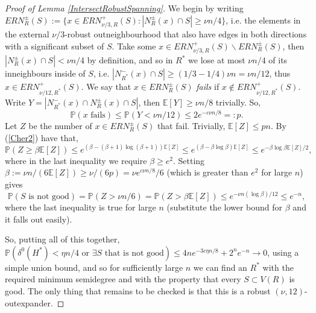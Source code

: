 \documentclass[10pt,letterpaper, reqno]{amsart}
\theoremstyle{definition}
\numberwithin{equation}{section}
\begin{document}
\begin{proof}[Proof of Lemma \ref{IntersectRobustSpanning}]
	We begin by writing $ERN^\pm_R(S) := \{ x \in ERN^+_{\nu/3,R}(S) : |N_R^\pm(x) \cap S| \geq \nu n /4 \}$, i.e. the elements in the external $\nu/3$-robust outneighbourhood that also have edges in both directions with a significant subset of $S$. Take some $x \in ERN^+_{\nu/3,R}(S) \backslash ERN^\pm_R(S)$, then $|N^\pm_R(x) \cap S | < \nu n/4$ by definition, and so in $R^*$ we lose at most $\nu n/4$ of its inneighbours inside of $S$, i.e. $|N_{R^*}^-(x) \cap S | \geq (1/3-1/4)\nu n = \nu n/12$, thus $x \in ERN^+_{\nu/12,R^*}(S)$. We say that $x \in ERN^\pm_R(S)$ \textit{fails} if $x \not \in ERN^+_{\nu/12,R^*}(S)$. Write $Y = |N^-_{R^*}(x) \cap N^\pm_R(x) \cap S|$, then $\mathbb{E}[Y] \geq \nu n/8$ trivially. So, 
	$$\mathbb{P}(x \text{ fails}) \leq \mathbb{P}(Y < \nu n/12) \leq 2e^{-c\nu n/8} =: p.$$
	Let $Z$ be the number of $x \in ERN^\pm_R(S)$ that fail. Trivially, $\mathbb{E}[Z] \leq pn$. By (\ref{Cher2}) have that,
	$$\mathbb{P}(Z \geq \beta\mathbb{E}[Z]) \leq e^{(\beta- (\beta+1)\log(\beta+1))\mathbb{E}[Z]} \leq
	e^{(\beta- \beta\log\beta)\mathbb{E}[Z]} \leq 
	 e^{-\beta\log \beta \mathbb{E}[Z]/2},$$
	 where in the last inequality we require $\beta \geq e^2$.
	Setting $\beta:= \nu n /(6\mathbb{E}[Z]) \geq \nu /(6p) = \nu e^{c\nu n /8}/6$ (which is greater than $e^2$ for large $n$) gives
	$$\mathbb{P}(S \text{ is not good}) = \mathbb{P}(Z> \nu n /6) = \mathbb{P}(Z > \beta\mathbb{E}[Z]) \leq e^{-\nu n (\log \beta )/12} \leq e^{-n},$$
	where the last inequality is true for large $n$ (substitute the lower bound for $\beta$ and it falls out easily).
	
	So, putting all of this together, $\mathbb{P}(\delta ^0(H^*) < \eta n/4 \text{ or } \exists S \text{ that is not good}) \leq 4ne^{-3c\eta n /8 } + 2^ne^{-n} \to 0$, using a simple union bound, and so for sufficiently large $n$ we can find an $R^*$ with the required minimum semidegree and with the property that every $S\subset V(R)$ is good. The only thing that remains to be checked is that this is a robust $(\nu,12)$-outexpander. 
	

\end{proof}
\end{document}
